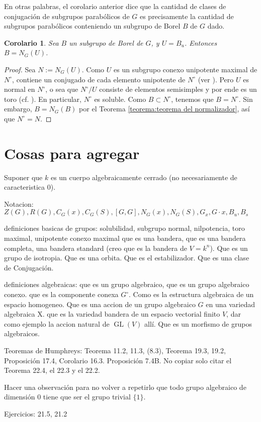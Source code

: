 \documentclass[spanish,10pt]{amsart}
\newtheorem{corollary}[theorem]{Corolario}
\theoremstyle{definition}
\theoremstyle{remark}
\numberwithin{equation}{section}
\begin{document}
En otras palabras, el corolario anterior dice que la cantidad de clases de conjugación de subgrupos parabólicos de $G$ es precisamente la cantidad de subgrupos parabólicos conteniendo un subgrupo de Borel $B$ de $G$ dado.

\begin{corollary}
Sea $B$ un subgrupo de Borel de $G$, y $U = B_u$. Entonces $B = N_G (U)$.
\end{corollary}
\begin{proof}
Sea $N := N_G (U)$. Como $U$ es un subgrupo conexo unipotente maximal de $N^\circ$, contiene un conjugado de cada elemento unipotente de $N^\circ$ (ver \cite[Teorema 22.2]{humphreys2012linearAlgebraicGroups}). Pero $U$ es normal en $N^\circ$, o sea que $N^\circ / U$ consiste de elementos semisimples y por ende es un toro (cf. \cite[Ejercicio 21.2]{humphreys2012linearAlgebraicGroups}). En particular, $N^\circ$ es soluble. Como $B \subset N^\circ$, tenemos que $B = N^\circ$. Sin embargo, $B = N_G (B)$ por el Teorema \ref{teorema:teorema del normalizador}, así que $N^\circ = N$.
\end{proof}




\section{Cosas para agregar}

Suponer que $k$ es un cuerpo algebraicamente cerrado (no necesariamente de caracteristica $0$).

Notacion: $Z ( G), R(G), C_G (x), C_G (S), [G,G], N_G (x), N_G (S), G_x , G\cdot x, B_u, B_s$

definiciones basicas de grupos: solubilidad, subgrupo normal,  nilpotencia, toro maximal, unipotente conexo maximal que es una bandera, que es una bandera completa, una bandera standard (creo que es la bandera de $V = k^n$). Que es un grupo de isotropia. Que es una orbita. Que es el estabilizador. Que es una clase de Conjugación.

definiciones algebraicas: que es un grupo algebraico, que es un grupo algebraico conexo. que es la componente conexa $G^\circ$. Como es la estructura algebraica de un espacio homogeneo. Que es una accion de un grupo algebraico $G$ en una variedad algebraica X. que es la variedad bandera de un espacio vectorial finito $V$, dar como ejemplo la accion natural de $\operatorname{GL}(V)$ allí. Que es un morfismo de grupos algebraicos.

Teoremas de Humphreys: Teorema 11.2, 11.3, (8.3), Teorema 19.3, 19.2, Proposición 17.4, Corolario 16.3. Proposición 7.4B. No copiar solo citar el Teorema 22.4, el 22.3 y el 22.2.

Hacer una observación para no volver a repetirlo que todo grupo algebraico de dimensión $0$ tiene que ser el grupo trivial $\{1\}$.

Ejercicios: 21.5, 21.2











\end{document}
